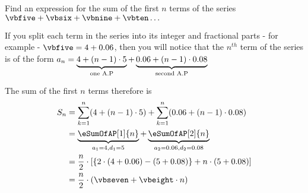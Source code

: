 



\gcalcexpr{\vbfive}{\vbone + \vbthree}
\gcalcexpr{\vbsix}{\vbfive + \vbtwo + \vbfour}
\gcalcexpr{\vbeight}{\vbtwo + \vbfour}
\gcalcexpr{\vbnine}{\vbsix + \vbtwo + \vbfour}
\gcalcexpr{\vbten}{\vbnine + \vbtwo + \vbfour}

\question[4] Find an expression for the sum of the first $n$ terms of the series 
$\vbfive + \vbsix + \vbnine + \vbten \ldots$

\watchout

\ifprintanswers
\fi 

\begin{solution}[\halfpage]
  If you split each term in the series into its integer and fractional parts - for example - 
  $\vbfive = \vbone + \vbthree$, then you will notice that the $n^{th}$ term of the series
  is of the form $a_n = \underbrace{4 + (n-1)\cdot5}_{\text{one A.P}} + 
  \underbrace{0.06 + (n-1)\cdot0.08}_{\text{second A.P}} $
	
	The sum of the first $n$ terms therefore is
	\begin{align}
		S_n &= \sum_{k=1}^{n}(\vbone + (n-1)\cdot\vbtwo) + \sum_{k=1}^{n}(\vbthree + (n-1)\cdot\vbfour) \\
		&= \underbrace{\eSumOfAP[1]{n}}_{a_1=\vbone, d_1=\vbtwo} + \underbrace{\eSumOfAP[2]{n}}_{a_2=\vbthree, d_2=\vbfour} \\
		&= \dfrac{n}{2}\cdot\left[ \lbrace 2\cdot(\vbone + \vbthree) - (\vbtwo + \vbfour)\rbrace + n\cdot(\vbtwo + \vbfour) \right] \\
		&= \dfrac{n}{2}\cdot\left( \vbseven + \vbeight\cdot n\right)
	\end{align}
\end{solution}
